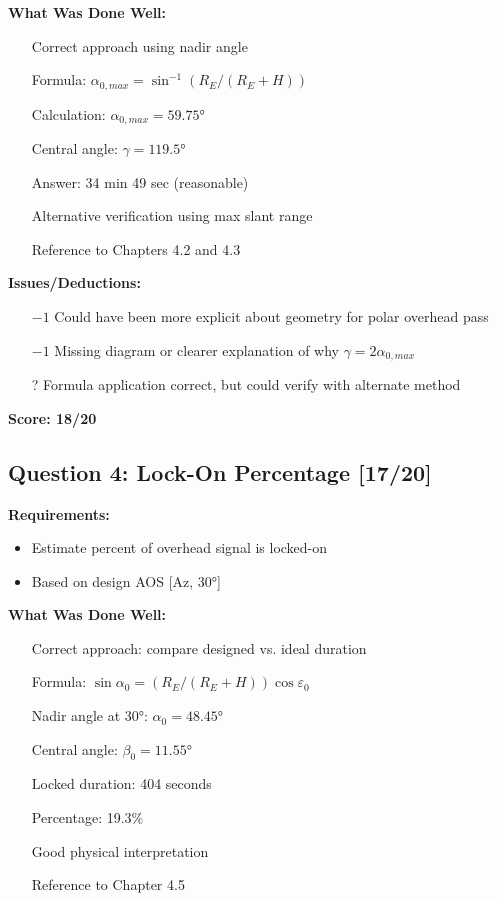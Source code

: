 \documentclass[11pt,letterpaper]{article}
\begin{document}
\textbf{What Was Done Well:}
\begin{itemize}
    \item[\color{green}\checkmark] Correct approach using nadir angle
    \item[\color{green}\checkmark] Formula: $\alpha_{0,max} = \sin^{-1}(R_E/(R_E+H))$
    \item[\color{green}\checkmark] Calculation: $\alpha_{0,max} = 59.75°$
    \item[\color{green}\checkmark] Central angle: $\gamma = 119.5°$
    \item[\color{green}\checkmark] Answer: 34 min 49 sec (reasonable)
    \item[\color{green}\checkmark] Alternative verification using max slant range
    \item[\color{green}\checkmark] Reference to Chapters 4.2 and 4.3
\end{itemize}

\textbf{Issues/Deductions:}
\begin{itemize}
    \item[\color{red}$-1$] Could have been more explicit about geometry for polar overhead pass
    \item[\color{red}$-1$] Missing diagram or clearer explanation of why $\gamma = 2\alpha_{0,max}$
    \item[\color{orange}?] Formula application correct, but could verify with alternate method
\end{itemize}

\textbf{Score: 18/20}

\subsection{Question 4: Lock-On Percentage [17/20]}

\textbf{Requirements:}
\begin{itemize}
    \item Estimate percent of overhead signal is locked-on
    \item Based on design AOS [Az, 30°]
\end{itemize}

\textbf{What Was Done Well:}
\begin{itemize}
    \item[\color{green}\checkmark] Correct approach: compare designed vs. ideal duration
    \item[\color{green}\checkmark] Formula: $\sin \alpha_0 = (R_E/(R_E+H)) \cos \varepsilon_0$
    \item[\color{green}\checkmark] Nadir angle at 30°: $\alpha_0 = 48.45°$
    \item[\color{green}\checkmark] Central angle: $\beta_0 = 11.55°$
    \item[\color{green}\checkmark] Locked duration: 404 seconds
    \item[\color{green}\checkmark] Percentage: 19.3\%
    \item[\color{green}\checkmark] Good physical interpretation
    \item[\color{green}\checkmark] Reference to Chapter 4.5
\end{itemize}
\end{document}
